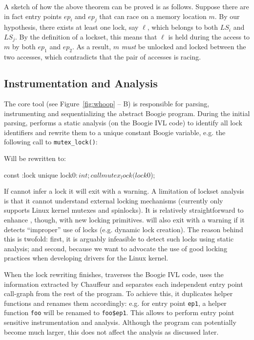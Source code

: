 A sketch of how the above theorem can be proved is as follows. Suppose there are in fact entry points $\mathit{ep}_{i}$ and $\mathit{ep}_{j}$ that can race on a memory location $m$. By our hypothesis, there exists at least one lock, say $\ell$, which belongs to both $\mathit{LS}_{i}$ and $\mathit{LS}_{j}$. By the definition of a lockset, this means that $\ell$ is held during the access to $m$ by both $ep_1$ and $ep_2$. As a result, $m$ \emph{must} be unlocked and locked between the two accesses, which contradicts that the pair of accesses is racing.

\subsection{Instrumentation and Analysis}
\label{whoop:method}

The core \whoop tool (see Figure~\ref{fig:whoop} -- B) is responsible for parsing, instrumenting and sequentializing the abstract Boogie program. During the initial parsing, \whoop performs a static analysis (on the Boogie IVL code) to identify all lock identifiers and rewrite them to a unique constant Boogie variable, e.g. the following call to \texttt{mutex\_lock()}:


Will be rewritten to:

\begin{boogie}
const {:lock} unique lock$0: int;
call mutex_lock(lock$0);
\end{boogie}

If \whoop cannot infer a lock it will exit with a warning. A limitation of lockset analysis is that it cannot understand external locking mechanisms (\whoop currently only supports Linux kernel mutexes and spinlocks). It is relatively straightforward to enhance \whoop, though, with new locking primitives. \whoop will also exit with a warning if it detects ``improper'' use of locks (e.g. dynamic lock creation). The reason behind this is twofold: first, it is arguably infeasible to detect such locks using static analysis; and second, because we want to advocate the use of good locking practices when developing drivers for the Linux kernel.

When the lock rewriting finishes, \whoop traverses the Boogie IVL code, uses the information extracted by Chauffeur and separates each independent entry point call-graph from the rest of the program. To achieve this, it duplicates helper functions and renames them accordingly: e.g. for entry point \texttt{ep1}, a helper function \texttt{foo} will be renamed to \texttt{foo\$ep1}. This allows \whoop to perform entry point sensitive instrumentation and analysis. Although the program can potentially become much larger, this does not affect the analysis as discussed later.

